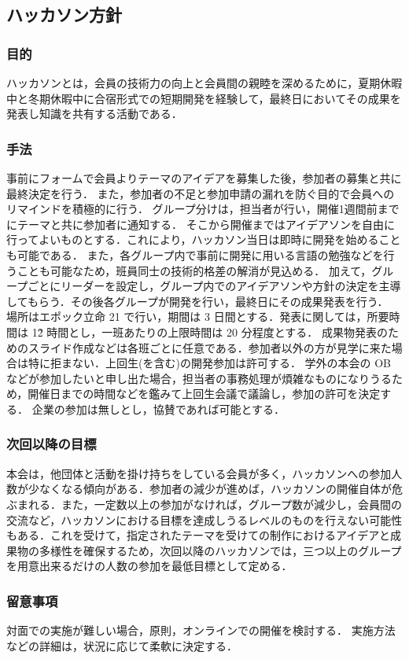 \subsection*{ハッカソン方針}


\subsubsection*{目的}
ハッカソンとは，会員の技術力の向上と会員間の親睦を深めるために，夏期休暇中と冬期休暇中に合宿形式での短期開発を経験して，最終日においてその成果を発表し知識を共有する活動である．

\subsubsection*{手法}
事前にフォームで会員よりテーマのアイデアを募集した後，参加者の募集と共に最終決定を行う．
また，参加者の不足と参加申請の漏れを防ぐ目的で会員へのリマインドを積極的に行う．
グループ分けは，担当者が行い，開催1週間前までにテーマと共に参加者に通知する．
そこから開催まではアイデアソンを自由に行ってよいものとする．これにより，ハッカソン当日は即時に開発を始めることも可能である．
また，各グループ内で事前に開発に用いる言語の勉強などを行うことも可能なため，班員同士の技術的格差の解消が見込める．
加えて，グループごとにリーダーを設定し，グループ内でのアイデアソンや方針の決定を主導してもらう．その後各グループが開発を行い，最終日にその成果発表を行う．
場所はエポック立命 21 で行い，期間は 3 日間とする．発表に関しては，所要時間は 1\~2 時間とし，一班あたりの上限時間は 20 分程度とする．
成果物発表のためのスライド作成などは各班ごとに任意である．参加者以外の方が見学に来た場合は特に拒まない．上回生(\fourthGrade を含む)の開発参加は許可する．
学外の本会の OB などが参加したいと申し出た場合，担当者の事務処理が煩雑なものになりうるため，開催日までの時間などを鑑みて上回生会議で議論し，参加の許可を決定する．
企業の参加は無しとし，協賛であれば可能とする．

\subsubsection*{次回以降の目標}
本会は，他団体と活動を掛け持ちをしている会員が多く，ハッカソンへの参加人数が少なくなる傾向がある．参加者の減少が進めば，ハッカソンの開催自体が危ぶまれる．また，一定数以上の参加がなければ，グループ数が減少し，会員間の交流など，ハッカソンにおける目標を達成しうるレベルのものを行えない可能性もある．これを受けて，指定されたテーマを受けての制作におけるアイデアと成果物の多様性を確保するため，次回以降のハッカソンでは，三つ以上のグループを用意出来るだけの人数の参加を最低目標として定める．

\subsubsection*{留意事項}
対面での実施が難しい場合，原則，オンラインでの開催を検討する．
実施方法などの詳細は，状況に応じて柔軟に決定する．
